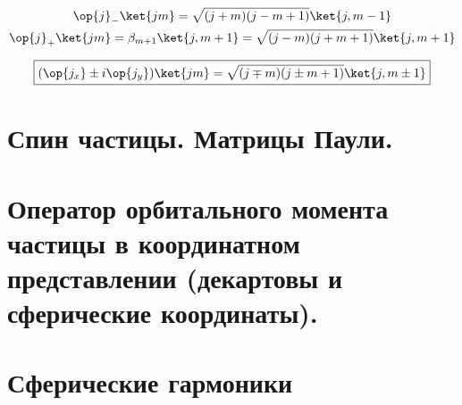 $$
\begin{gathered}
\op{j}_{-} \ket{jm} = \sqrt{(j+m)(j-m+1)} \ket{j, m-1} \\
\op{j}_{+} \ket{jm} = \beta_{m+1} \ket{j, m+1} = \sqrt{(j-m)(j+m+1)} \ket{j, m+1}
\end{gathered}
$$

\begin{equation}
\label{eq:8_2_8}
\boxed {
	(\op{j_x} \pm i \op{j_y}) \ket{jm} = \sqrt{(j \mp m)(j \pm m + 1)} \ket{j, m \pm 1}
}
\end{equation}


\section{Спин частицы. Матрицы Паули.}


\section{Оператор орбитального момента частицы в координатном представлении (декартовы и сферические координаты).}


\section{Сферические гармоники}
